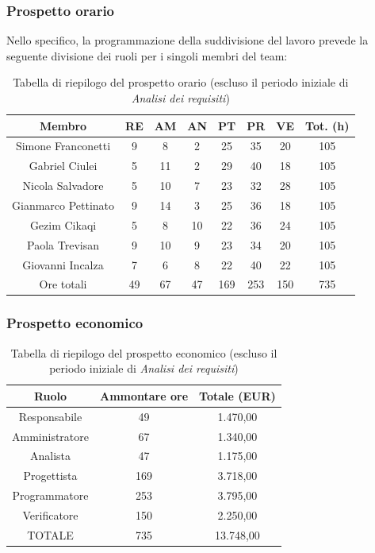 \subsubsection{Prospetto orario}
Nello specifico, la programmazione della suddivisione del lavoro prevede la seguente divisione dei ruoli per i singoli membri del team:
\begin{table}[h]
	\caption{Tabella di riepilogo del prospetto orario (escluso il periodo iniziale di \textit{Analisi dei requisiti})}
\begin{center}
\begin{tabular}{ |c|c|c|c|c|c|c|c|  }
 \hline
 Membro 		& RE 		& AM 		& AN 	& PT 	& PR 	& VE 	& Tot. (h)\\
 \hline\hline
 Simone	Franconetti		& 9  	 	& 8			& 2 		& 25 		& 35 		& 20 		& 105\\
 Gabriel Ciulei		& 5 			& 11 		& 2 		& 29			& 40 		& 18 		& 105\\
 Nicola	Salvadore		& 5  		& 10 		& 7 		& 23 		& 32 		& 28 		& 105\\
 Gianmarco	Pettinato	& 9   		& 14 		& 3 		& 25		 	& 36 		& 18 		& 105\\
 Gezim	Cikaqi		& 5  		& 8  		& 10		& 22 		& 36 		& 24	 	& 105\\
 Paola	Trevisan		& 9  		& 10 		& 9 		& 23 		& 34 		& 20 		& 105\\
 Giovanni	Incalza	& 7  		& 6	 		& 8 		& 22 		& 40		 	& 22  		& 105\\
 \hline\hline
 Ore totali		& 49 	& 67		& 47 	& 169 	& 253 	& 150 	& 735\\
  \hline
\end{tabular}
\end{center}
\end{table}

\newpage
\subsubsection{Prospetto economico}
\begin{table}[h]
	\caption{Tabella di riepilogo del prospetto economico (escluso il periodo iniziale di \textit{Analisi dei requisiti})}
	\begin{center}
		\begin{tabular}{ |c|c|c|  }
			\hline
			Ruolo 		& Ammontare ore 	& Totale (EUR)\\
			\hline
			\hline
			Responsabile	& 49 	& 1.470,00\\
			Amministratore	& 67		& 1.340,00\\
			Analista		& 47 	& 1.175,00\\
			Progettista		& 169	& 3.718,00\\
			Programmatore	& 253	& 3.795,00\\
			Verificatore	& 150 	& 2.250,00\\
			\hline\hline
			TOTALE		& 735		& 13.748,00\\
			\hline
		\end{tabular}
	\end{center}
\end{table}

